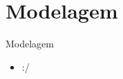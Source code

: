 \section{Modelagem}\label{sec:modelagem}
\begin{frame}[allowframebreaks]{Modelagem}
	\begin{itemize}
		\setlength{\itemsep}{0.5em}
		\item :/
	\end{itemize}
\end{frame}